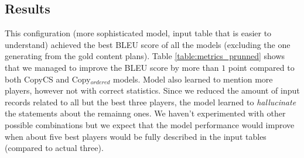 \subsection{Results}

This configuration (more sophisticated model, input table that is easier to understand) achieved the best BLEU score of all the models (excluding the one generating from the gold content plans). Table \ref{table:metrics_prunned} shows that we managed to improve the BLEU score by more than $1$ point compared to both CopyCS and Copy$_{ordered}$ models. Model also learned to mention more players, however not with correct statistics. Since we reduced the amount of input records related to all but the best three players, the model learned to \emph{hallucinate} the statements about the remainng ones. We haven't experimented with other possible combinations but we expect that the model performance would improve when about five best players would be fully described in the input tables (compared to actual three).

\begin{table}[h]
    \centering
    \caption{Performance metrics on the Content Selection and Planning model.} \label{table:metrics_prunned}
\end{table}

